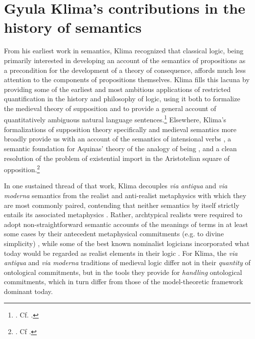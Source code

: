 \documentclass[]{article}
\begin{document}
\section{Gyula Klima's contributions in the history of semantics}
From his earliest work in semantics, 
Klima recognized that classical logic, 
being primarily interested in developing an account of the semantics of propositions as a precondition for the development of a theory of consequence, 
affords much less attention to the components of propositions themselves. 
Klima fills this lacuna by providing some of the earliest and most ambitious applications of restricted quantification in the history and philosophy of logic, 
using it both to formalize the medieval theory of supposition 
and to provide a general account of quantitatively ambiguous natural language sentences.\footnote{\autocite{Klima1988,Klima1990,KlimaSandu1990,Klima1991b}. Cf. \autocite{Parsons2014}.} 
Elsewhere, 
Klima's formalizations of supposition theory specifically 
and medieval semantics more broadly 
provide us with an account of the semantics of intensional verbs \autocite{Klima1991}, 
a semantic foundation for Aquinas' theory of the analogy of being \autocite{Klima1996,Klima2002}, 
and a clean resolution of the problem of existential import in the Aristotelian square of opposition.\footnote{\autocite{Klima2001}. Cf \autocite{Read2015b}.} 

In one sustained thread of that work, 
Klima decouples \emph{via antiqua} and \emph{via moderna} semantics 
from the realist and anti-realist metaphysics with which they are most commonly paired,
contending that neither semantics by itself strictly entails its associated metaphysics \autocite{Klima1999,Klima2011}. 
Rather, archtypical realists were required to adopt non-straightforward semantic accounts of the meanings of terms in at least some cases by their antecedent metaphysical commitments (e.g. to divine simplicity) \autocite{Klima2002b},
while some of the best known nominalist logicians incorporated what today would be regarded as realist elements in their logic \autocite{Klima2005}. 
For Klima, the \emph{via antiqua} and \emph{via moderna} traditions of medieval logic 
differ not in their \emph{quantity} of ontological commitments, 
but in the tools they provide for \emph{handling} ontological commitments, 
which in turn differ from those of the model-theoretic framework dominant today. 
\end{document}
